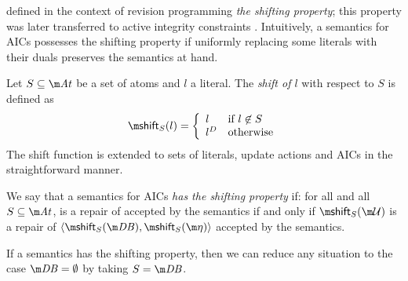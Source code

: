 \citet{tcs/MarekT98} defined in the context of revision programming \emph{the shifting property}; this property was later transferred to active integrity constraints \cite{tplp/CaropreseT11}. 
Intuitively, a semantics for AICs possesses the shifting property if uniformly replacing some literals with their duals
preserves the semantics at hand. 

\begin{definition}
 Let $S\subseteq\atoms$ be a set of atoms and $l$ a literal. The \emph{shift of $l$} with respect to $S$ is defined as 
 \[\shift_S(l) = \left\{\begin{array}{ll}                                                                                                             l&\text{if $l\not\in S$}\\                                                                                                              l^D&\text{otherwise}                                                                                                                                      \end{array}\right.\]
 The shift function is extended to sets of literals, update actions and AICs in the straightforward manner. 
\end{definition}

\begin{definition}
 We say that a semantics for AICs \emph{has the shifting property} if: for all \fulldb and all $S\subseteq \atoms$, \UU is a repair of \fulldb accepted by the semantics if and only if $\shift_S(\UU)$ is a repair of $\langle\shift_S(\db),\shift_S(\aics)\rangle$ accepted by the semantics.
\end{definition}

If a semantics has the shifting property, then we can reduce any situation to the case $\db=\emptyset$ by taking $S=\db$. 

